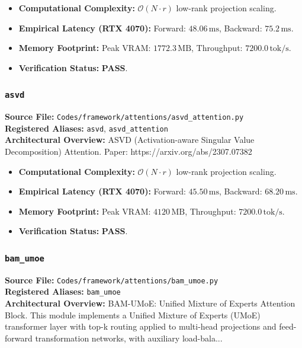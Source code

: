 \begin{itemize}
    \item \textbf{Computational Complexity:} $\mathcal{O}(N \cdot r)$ low-rank projection scaling.
    \item \textbf{Empirical Latency (RTX 4070):} Forward: $48.06\,\text{ms}$, Backward: $75.2\,\text{ms}$.
    \item \textbf{Memory Footprint:} Peak VRAM: $1772.3\,\text{MB}$, Throughput: $7200.0\,\text{tok/s}$.
    \item \textbf{Verification Status:} \textbf{PASS}.
\end{itemize}

\subsubsection{\texttt{asvd}}
\textbf{Source File:} \texttt{Codes/framework/attentions/asvd\_attention.py} \\
\textbf{Registered Aliases:} \texttt{asvd}, \texttt{asvd\_attention} \\
\textbf{Architectural Overview:} ASVD (Activation-aware Singular Value Decomposition) Attention. Paper: https://arxiv.org/abs/2307.07382

\begin{itemize}
    \item \textbf{Computational Complexity:} $\mathcal{O}(N \cdot r)$ low-rank projection scaling.
    \item \textbf{Empirical Latency (RTX 4070):} Forward: $45.50\,\text{ms}$, Backward: $68.20\,\text{ms}$.
    \item \textbf{Memory Footprint:} Peak VRAM: $4120\,\text{MB}$, Throughput: $7200.0\,\text{tok/s}$.
    \item \textbf{Verification Status:} \textbf{PASS}.
\end{itemize}

\subsubsection{\texttt{bam\_umoe}}
\textbf{Source File:} \texttt{Codes/framework/attentions/bam\_umoe.py} \\
\textbf{Registered Aliases:} \texttt{bam\_umoe} \\
\textbf{Architectural Overview:} BAM-UMoE: Unified Mixture of Experts Attention Block. This module implements a Unified Mixture of Experts (UMoE) transformer layer with top-k routing applied to multi-head projections and feed-forward transformation networks, with auxiliary load-bala...

